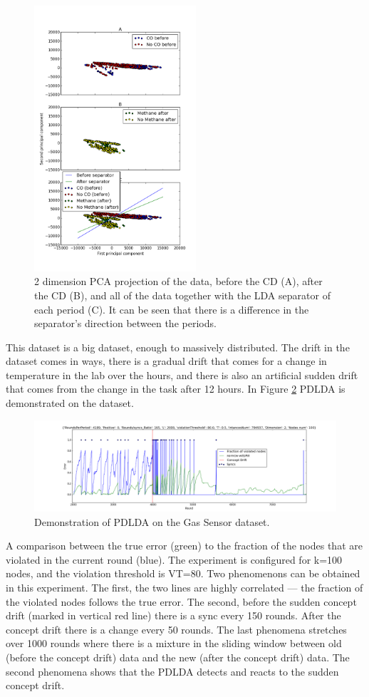 \documentclass[11pt,twocolumn,varwidth=true,a4paper,fleqn]{article}
\begin{document}
\begin{figure}[h]
\centering
\includegraphics[width=60mm]{BigGas/showData.png}
\caption{2 dimension PCA projection of the data, before the CD (A),
after the CD (B), and all of the data together with the LDA separator of each
period (C). It can be seen that there is a difference in the separator's
direction between the periods.}
\label{BigGasShowData}
\end{figure}

This dataset is a big dataset, enough to massively distributed. The drift in
the dataset comes in ways, there is a gradual drift that comes for a change in
temperature in the lab over the hours, and there is also an artificial sudden
drift that comes from the change in the task after 12 hours. In Figure
\ref{BigGasOverTime} PDLDA is demonstrated on the dataset.

\begin{figure}[ht!]
\centering
\includegraphics[width=\textwidth]{BigGas/overTime100k.png}
\caption{Demonstration of PDLDA on the Gas Sensor dataset.}
\label{BigGasOverTime}
\end{figure}
A comparison between the true error (green) to the fraction of the nodes that 
are violated in the current round (blue). 
The experiment is configured for k=100 nodes, and the violation threshold is
VT=80. 
Two phenomenons can be obtained in this experiment.
The first, the two lines are highly correlated --- the fraction of the violated
nodes follows the true error. The second,  before the sudden concept drift (marked in vertical red line) there is a sync every 150 rounds. 
After the concept drift there is a change every 50 rounds. 
The last phenomena stretches over 1000 rounds where there is a mixture in the 
sliding window between old (before the concept drift) data and the new 
(after the concept drift) data. The second phenomena shows that the PDLDA
detects and reacts to the sudden concept drift.
\end{document}
